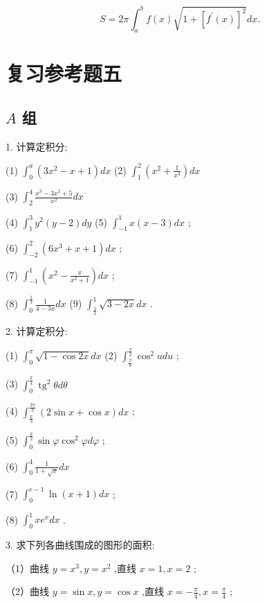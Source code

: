 \documentclass[lang=cn,newtx,12pt,scheme=chinese]{elegantbook}
\begin{document}
\[
S = {2\pi }{\int }_{a}^{b}f\left( x\right) \sqrt{1 + {\left\lbrack {f}^{\prime }\left( x\right) \right\rbrack }^{2}}{dx}.
\]

\chapter*{复习参考题五}

\section*{\(A\) 组}

1. 计算定积分;

(1) \({\int }_{0}^{a}\left( {3{x}^{2} - x + 1}\right) {dx}\) (2) \({\int }_{1}^{2}\left( {{x}^{2} + \frac{1}{{x}^{4}}}\right) {dx}\)

(3) \({\int }_{2}^{4}\frac{{x}^{3} - 3{x}^{2} + 5}{{x}^{2}}{dx}\)

(4) \({\int }_{1}^{3}{y}^{2}\left( {y - 2}\right) {dy}\) (5) \({\int }_{-1}^{1}x\left( {x - 3}\right) {dx}\) ;

(6) \({\int }_{-2}^{2}\left( {6{x}^{3} + x + 1}\right) {dx}\) ;

(7) \({\int }_{-1}^{1}\left( {{x}^{2} - \frac{x}{{x}^{2} + 1}}\right) {dx}\) ;

(8) \({\int }_{0}^{\frac{1}{3}}\frac{1}{4 - {3x}}{dx}\) (9) \({\int }_{\frac{1}{2}}^{1}\sqrt{3 - {2x}}{dx}\) .

2. 计算定积分:

(1) \({\int }_{0}^{\pi }\sqrt{1 - \cos {2x}}{dx}\) (2) \({\int }_{\frac{\pi }{6}}^{\frac{\pi }{2}}{\cos }^{2}{udu}\) ;

(3) \({\int }_{0}^{\frac{\pi }{4}}{\operatorname{tg}}^{2}{\theta d\theta }\)

(4) \({\int }_{\frac{\pi }{3}}^{\frac{2\pi }{3}}\left( {2\sin x + \cos x}\right) {dx}\) ;

(5) \({\int }_{0}^{\frac{\pi }{2}}\sin \varphi {\cos }^{2}{\varphi d\varphi }\) ;

(6) \({\int }_{0}^{4}\frac{1}{1 + \sqrt{x}}{dx}\)

(7) \({\int }_{0}^{e - 1}\ln \left( {x + 1}\right) {dx}\) ;

(8) \({\int }_{0}^{1}x{e}^{x}{dx}\) .

3. 求下列各曲线围成的图形的面积:

（1）曲线 \(y = {x}^{3},y = {x}^{2}\) ,直线 \(x = 1,x = 2\) ;

（2）曲线 \(y = \sin x,y = \cos x\) ,直线 \(x = - \frac{\pi }{4},x = \frac{\pi }{4}\) ;
\end{document}
